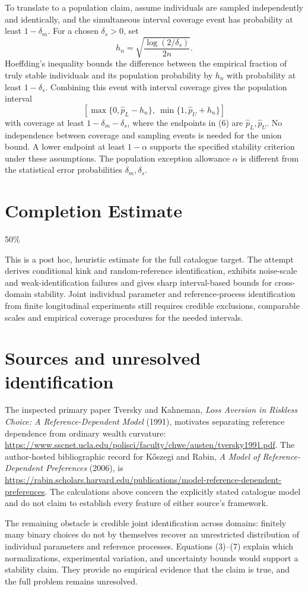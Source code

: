 \documentclass[11pt]{article}
\begin{document}
To translate to a population claim, assume individuals are sampled independently and identically, and the simultaneous interval coverage event has probability at least $1-\delta_m$. For a chosen $\delta_s>0$, set
\[
 h_n=\sqrt{\frac{\log(2/\delta_s)}{2n}}.
\]
Hoeffding's inequality bounds the difference between the empirical fraction of truly stable individuals and its population probability by $h_n$ with probability at least $1-\delta_s$. Combining this event with interval coverage gives the population interval
\[
 \left[\max\{0,\widehat p_L-h_n\},\ \min\{1,\widehat p_U+h_n\}\right] \tag{7}
\]
with coverage at least $1-\delta_m-\delta_s$, where the endpoints in (6) are $\widehat p_L,\widehat p_U$. No independence between coverage and sampling events is needed for the union bound. A lower endpoint at least $1-\alpha$ supports the specified stability criterion under these assumptions. The population exception allowance $\alpha$ is different from the statistical error probabilities $\delta_m,\delta_s$.

\section{Completion Estimate}
50\%

This is a post hoc, heuristic estimate for the full catalogue target.
The attempt derives conditional kink and random-reference identification, exhibits noise-scale and weak-identification failures and gives sharp interval-based bounds for cross-domain stability. Joint individual parameter and reference-process identification from finite longitudinal experiments still requires credible exclusions, comparable scales and empirical coverage procedures for the needed intervals.

\section*{Sources and unresolved identification}
The inspected primary paper Tversky and Kahneman, \emph{Loss Aversion in Riskless Choice: A Reference-Dependent Model} (1991), motivates separating reference dependence from ordinary wealth curvature:
\url{https://www.sscnet.ucla.edu/polisci/faculty/chwe/austen/tversky1991.pdf}.
The author-hosted bibliographic record for K\H{o}szegi and Rabin, \emph{A Model of Reference-Dependent Preferences} (2006), is
\url{https://rabin.scholars.harvard.edu/publications/model-reference-dependent-preferences}.
The calculations above concern the explicitly stated catalogue model and do not claim to establish every feature of either source's framework.

The remaining obstacle is credible joint identification across domains: finitely many binary choices do not by themselves recover an unrestricted distribution of individual parameters and reference processes. Equations (3)--(7) explain which normalizations, experimental variation, and uncertainty bounds would support a stability claim. They provide no empirical evidence that the claim is true, and the full problem remains unresolved.
\end{document}
